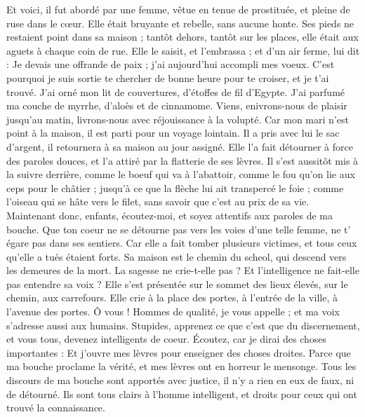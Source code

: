 \begin{multicols}{2}
Et voici, il fut abordé par une femme, vêtue en tenue de prostituée, et pleine de ruse dans le cœur.
Elle était bruyante et rebelle, sans aucune honte. Ses pieds ne restaient point dans sa maison ;
tantôt dehors, tantôt sur les places, elle était aux aguets à chaque coin de rue.
Elle le saisit, et l’embrassa ; et d’un air ferme, lui dit :
Je devais une offrande de paix ; j'ai aujourd'hui accompli mes voeux.
C'est pourquoi je suis sortie te chercher de bonne heure pour te croiser, et je t'ai trouvé.
J'ai orné mon lit de couvertures, d’étoffes de fil d'Egypte.
J’ai parfumé ma couche de myrrhe, d'aloès et de cinnamome.
Viens, enivrons-nous de plaisir jusqu'au matin, livrons-nous avec réjouissance à la volupté.
Car mon mari n'est point à la maison, il est parti pour un voyage lointain.
Il a pris avec lui le sac d'argent, il retournera à sa maison au jour assigné.
Elle l'a fait détourner à force des paroles douces, et l'a attiré par la flatterie de ses lèvres.
Il s'est aussitôt mis à la suivre derrière, comme le boeuf qui va à l’abattoir, comme le fou qu’on lie aux ceps pour le châtier ;
jusqu'à ce que la flèche lui ait transpercé le foie ; comme l'oiseau qui se hâte vers le filet, sans savoir que c’est au prix de sa vie.
Maintenant donc, enfants, écoutez-moi, et soyez attentifs aux paroles de ma bouche.
Que ton coeur ne se détourne pas vers les voies d’une telle femme, ne t' égare pas dans ses sentiers.
Car elle a fait tomber plusieurs victimes, et tous ceux qu'elle a tués étaient forts.
Sa maison est le chemin du scheol, qui descend vers les demeures de la mort.
\TextTitle{[La sagesse]}
\VerseOne{}La sagesse ne crie-t-elle pas ? Et l'intelligence ne fait-elle pas entendre sa voix ?
Elle s'est présentée sur le sommet des lieux élevés, sur le chemin, aux carrefours.
Elle crie à la place des portes, à l'entrée de la ville, à l'avenue des portes.
Ô vous ! Hommes de qualité, je vous appelle ; et ma voix s'adresse aussi aux humains.
Stupides, apprenez ce que c'est que du discernement, et vous tous, devenez intelligents de coeur.
Écoutez, car je dirai des choses importantes : Et j'ouvre mes lèvres pour enseigner des choses droites.
Parce que ma bouche proclame la vérité, et mes lèvres ont en horreur le mensonge.
Tous les discours de ma bouche sont apportés avec justice, il n'y a rien en eux de faux, ni de détourné.
Ils sont tous clairs à l'homme intelligent, et droits pour ceux qui ont trouvé la connaissance.

\end{multicols}
